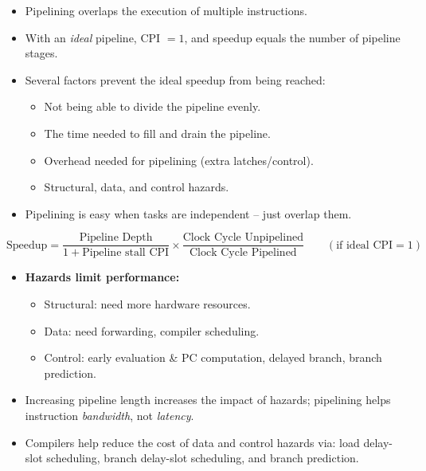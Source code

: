 \begin{itemize}[leftmargin=*]
  \item Pipelining overlaps the execution of multiple instructions.
  \item With an \emph{ideal} pipeline, CPI $=1$, and speedup equals the
  number of pipeline stages.
  \item Several factors prevent the ideal speedup from being reached:
  \begin{itemize}
    \item Not being able to divide the pipeline evenly.
    \item The time needed to fill and drain the pipeline.
    \item Overhead needed for pipelining (extra latches/control).
    \item Structural, data, and control hazards.
  \end{itemize}
  \item Pipelining is easy when tasks are independent -- just overlap them.
\end{itemize}

\[
  \text{Speedup} = \frac{\text{Pipeline Depth}}{1+\text{Pipeline stall CPI}} \times \frac{\text{Clock Cycle Unpipelined}}{\text{Clock Cycle Pipelined}}
  \qquad (\text{if ideal CPI}=1)
\]

\begin{itemize}[leftmargin=*]
  \item \textbf{Hazards limit performance:}
  \begin{itemize}
    \item Structural: need more hardware resources.
    \item Data: need forwarding, compiler scheduling.
    \item Control: early evaluation \& PC computation, delayed branch,
    branch prediction.
  \end{itemize}
  \item Increasing pipeline length increases the impact of hazards;
  pipelining helps instruction \emph{bandwidth}, not \emph{latency}.
  \item Compilers help reduce the cost of data and control hazards via:
  load delay-slot scheduling, branch delay-slot scheduling, and branch
  prediction.
\end{itemize}
